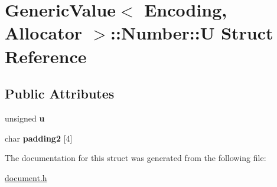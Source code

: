\hypertarget{a00324}{}\section{Generic\+Value$<$ Encoding, Allocator $>$\+:\+:Number\+:\+:U Struct Reference}
\label{a00324}
\subsection*{Public Attributes}
\begin{DoxyCompactItemize}
\item 
unsigned {\bfseries u}\hypertarget{a00324_a175e3a2bd43e6880791eb7c950d2f147}{}\label{a00324_a175e3a2bd43e6880791eb7c950d2f147}

\item 
char {\bfseries padding2} \mbox{[}4\mbox{]}\hypertarget{a00324_a9341f65c1645f24fd001a1ebf58d3c5b}{}\label{a00324_a9341f65c1645f24fd001a1ebf58d3c5b}

\end{DoxyCompactItemize}


The documentation for this struct was generated from the following file\+:\begin{DoxyCompactItemize}
\item 
\hyperlink{a00473}{document.\+h}\end{DoxyCompactItemize}
